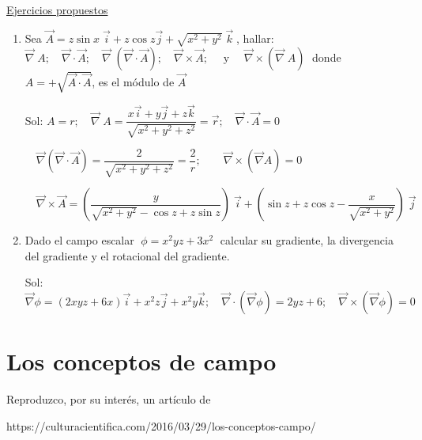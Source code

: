 \underline{Ejercicios propuestos}

\begin{enumerate}
\item Sea $\overrightarrow A = z \sin x \; \vec i + z \cos z \vec j + \sqrt{x^2+y^2}\; \vec k\; $, hallar:  	$\overrightarrow \nabla \; A; \quad   \overrightarrow {\nabla} \cdot \overrightarrow A; \quad \overrightarrow \nabla \; (\overrightarrow {\nabla} \cdot \overrightarrow A); \quad \overrightarrow {\nabla} \times \overrightarrow A; \quad \text { y } \quad \overrightarrow {\nabla} \times ( \overrightarrow \nabla \; A )\; $  donde $A =+\sqrt{\overrightarrow A \cdot \overrightarrow A}$, es el módulo de $\overrightarrow A$

\vspace{3mm} \textcolor{gris}{Sol: $A=r; \quad \overrightarrow \nabla \; A =\dfrac {x\vec i + y \vec j + z \vec k}{\sqrt{x^2+y^2+z^2}}=\vec r; \quad \overrightarrow \nabla \cdot \overrightarrow A= 0 $}

\textcolor{gris}{$\quad \overrightarrow \nabla (\overrightarrow \nabla \cdot \overrightarrow A)=\dfrac {2}{\sqrt{x^2+y^2+z^2}}=\dfrac 2 r ;\qquad \overrightarrow \nabla \times (\overrightarrow \nabla A ) =0$}


\textcolor{gris}{$ \quad \overrightarrow \nabla \times \overrightarrow A= \left( \dfrac {y}{\sqrt{x^2+y^2}-\cos z + z \sin z} \right)\; \vec i + \left (\sin z + z \cos z - \dfrac {x}{\sqrt{x^2+y^2}}  \right)\; \vec j$}

\item Dado el campo escalar $\; \phi=x^2yz+3x^2\; $ calcular su gradiente, la divergencia del gradiente y el rotacional del gradiente.

\vspace{3mm} \textcolor{gris}{Sol: $\overrightarrow \nabla \phi= (2xyz+6x)\vec i+x^2z\vec j+x^2y\vec k; \quad \overrightarrow \nabla \cdot(\overrightarrow \nabla \phi) = 2yz+6 ; \quad \overrightarrow \nabla \times (\overrightarrow \nabla \phi) =0$}
\end{enumerate}

\section{Los conceptos de campo} \label{concepto-campo}

\textcolor{gris}{ Reproduzco, por su interés, un artículo de}

\noindent \textcolor{gris}{ https://culturacientifica.com/2016/03/29/los-conceptos-campo/}
 
